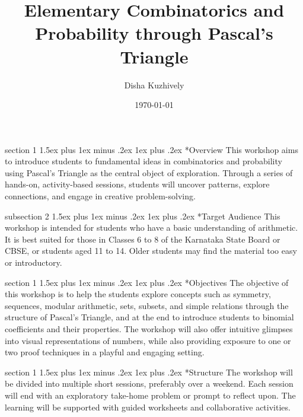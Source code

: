 \documentclass[a4paper,twoside,notitlepage,
11pt,
]{amsart}
\makeatletter
\renewcommand{\section}{\@startsection
  {section}%
  {1}%
  {\z@}%
  {1.5ex plus 1ex minus .2ex}%
  {1ex plus .2ex}%
  {\normalfont\bfseries}}%
\renewcommand{\subsection}{\@startsection
    {subsection}%
    {2}%
    {\z@}%
    {1.5ex plus 1ex minus .2ex}%
    {1ex plus .2ex}%
    {\normalfont\itshape}}%
\makeatother
\begin{document}
\title[Pascal's Triangle]{Elementary Combinatorics and Probability through Pascal's Triangle}
\author{Disha Kuzhively}
\address{\textit{International Centre for Theoretical Sciences - TIFR, Bangalore}}
\date{\today}
\maketitle
\section*{Overview}
This workshop aims to introduce students to fundamental ideas in combinatorics and probability using Pascal's Triangle as the central object of exploration. Through a series of hands-on, activity-based sessions, students will uncover patterns, explore connections, and engage in creative problem-solving.

\subsection*{Target Audience}
This workshop is intended for students who have a basic understanding of arithmetic. It is best suited for those in Classes 6 to 8 of the Karnataka State Board or CBSE, or students aged 11 to 14. Older students may find the material too easy or introductory.

\section*{Objectives}
The objective of this workshop is to help the students explore concepts such as symmetry, sequences, modular arithmetic, sets, subsets, and simple relations through the structure of Pascal's Triangle, and at the end to introduce students to binomial coefficients and their properties. The workshop will also offer intuitive glimpses into visual representations of numbers, while also providing exposure to one or two proof techniques in a playful and engaging setting.

\section*{Structure}
The workshop will be divided into multiple short sessions, preferably over a weekend. Each session will end with an exploratory take-home problem or prompt to reflect upon. The learning will be supported with guided worksheets and collaborative activities.
\end{document}
